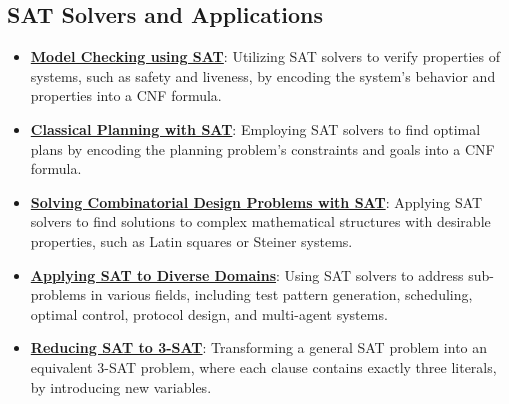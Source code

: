 \documentclass{article}%
\begin{document}
\subsection{SAT Solvers and Applications}%
\label{subsec:SATSolversandApplications}%
\begin{itemize}[leftmargin=*]%
\item \href{https://purdue.brightspace.com/d2l/common/assets/pdfjs-d2l-dist/1.0.14-legacy/web/viewer.html?file=\%2Fcontent\%2Fenforced\%2F1095467-wl.202510.CS.24300.001\%2F13L1-Logic.pdf\%3Fou\%3D1095467\&lang=en-us\&container=d2l-fileviewer-rendered-pdf\&fullscreen=d2l-fileviewer-rendered-pdf-dialog\&height=667#page=20}{\textbf{Model Checking using SAT}}: Utilizing SAT solvers to verify properties of systems, such as safety and liveness, by encoding the system's behavior and properties into a CNF formula.%
\item \href{https://purdue.brightspace.com/d2l/common/assets/pdfjs-d2l-dist/1.0.14-legacy/web/viewer.html?file=\%2Fcontent\%2Fenforced\%2F1095467-wl.202510.CS.24300.001\%2F13L1-Logic.pdf\%3Fou\%3D1095467\&lang=en-us\&container=d2l-fileviewer-rendered-pdf\&fullscreen=d2l-fileviewer-rendered-pdf-dialog\&height=667#page=21}{\textbf{Classical Planning with SAT}}: Employing SAT solvers to find optimal plans by encoding the planning problem's constraints and goals into a CNF formula.%
\item \href{https://purdue.brightspace.com/d2l/common/assets/pdfjs-d2l-dist/1.0.14-legacy/web/viewer.html?file=\%2Fcontent\%2Fenforced\%2F1095467-wl.202510.CS.24300.001\%2F13L1-Logic.pdf\%3Fou\%3D1095467\&lang=en-us\&container=d2l-fileviewer-rendered-pdf\&fullscreen=d2l-fileviewer-rendered-pdf-dialog\&height=667#page=22}{\textbf{Solving Combinatorial Design Problems with SAT}}: Applying SAT solvers to find solutions to complex mathematical structures with desirable properties, such as Latin squares or Steiner systems.%
\item \href{https://purdue.brightspace.com/d2l/common/assets/pdfjs-d2l-dist/1.0.14-legacy/web/viewer.html?file=\%2Fcontent\%2Fenforced\%2F1095467-wl.202510.CS.24300.001\%2F13L1-Logic.pdf\%3Fou\%3D1095467\&lang=en-us\&container=d2l-fileviewer-rendered-pdf\&fullscreen=d2l-fileviewer-rendered-pdf-dialog\&height=667#page=23}{\textbf{Applying SAT to Diverse Domains}}: Using SAT solvers to address sub-problems in various fields, including test pattern generation, scheduling, optimal control, protocol design, and multi-agent systems.%
\item \href{https://purdue.brightspace.com/d2l/common/assets/pdfjs-d2l-dist/1.0.14-legacy/web/viewer.html?file=\%2Fcontent\%2Fenforced\%2F1095467-wl.202510.CS.24300.001\%2F13L1-Logic.pdf\%3Fou\%3D1095467\&lang=en-us\&container=d2l-fileviewer-rendered-pdf\&fullscreen=d2l-fileviewer-rendered-pdf-dialog\&height=667#page=24}{\textbf{Reducing SAT to 3-SAT}}: Transforming a general SAT problem into an equivalent 3-SAT problem, where each clause contains exactly three literals, by introducing new variables.%

\end{itemize}
\end{document}
